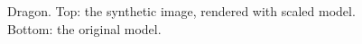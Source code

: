 \documentclass[10pt,twocolumn,letterpaper]{article}
\begin{document}
\begin{figure}[t]
\begin{center}
   \quad
\end{center}
   \caption{Dragon. Top: the synthetic image, rendered with scaled model. Bottom: the original model.}
\label{fig:dragonmodel}
\end{figure}
\end{document}

